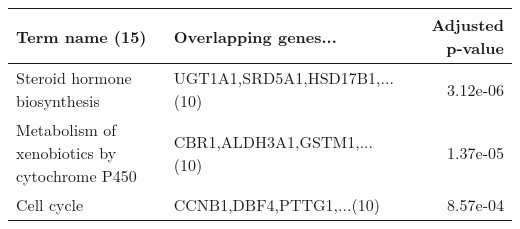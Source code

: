 \begin{tabular}{llr}
\toprule
                              Term name (15) &          Overlapping genes... &  Adjusted p-value \\
\midrule
                Steroid hormone biosynthesis & UGT1A1,SRD5A1,HSD17B1,...(10) &          3.12e-06 \\
Metabolism of xenobiotics by cytochrome P450 &    CBR1,ALDH3A1,GSTM1,...(10) &          1.37e-05 \\
                                  Cell cycle &      CCNB1,DBF4,PTTG1,...(10) &          8.57e-04 \\
\bottomrule
\end{tabular}
